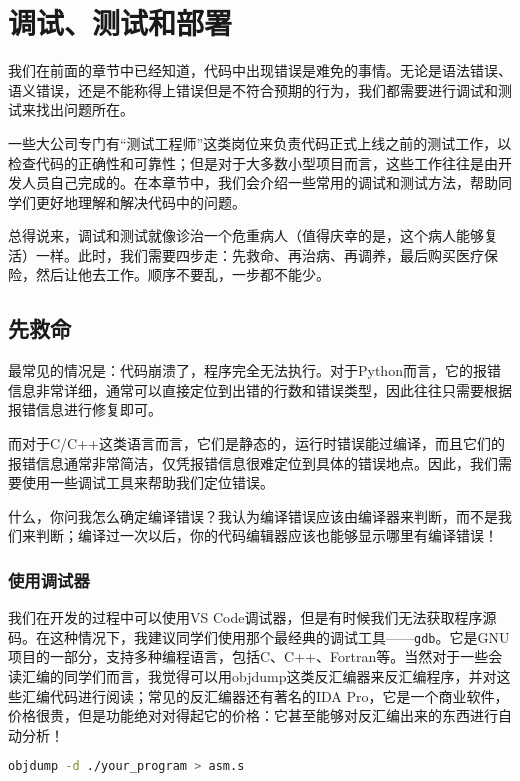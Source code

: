 \chapter{调试、测试和部署}

我们在前面的章节中已经知道，代码中出现错误是难免的事情。无论是语法错误、语义错误，还是不能称得上错误但是不符合预期的行为，我们都需要进行调试和测试来找出问题所在。

一些大公司专门有“测试工程师”这类岗位来负责代码正式上线之前的测试工作，以检查代码的正确性和可靠性；但是对于大多数小型项目而言，这些工作往往是由开发人员自己完成的。在本章节中，我们会介绍一些常用的调试和测试方法，帮助同学们更好地理解和解决代码中的问题。

总得说来，调试和测试就像诊治一个危重病人（值得庆幸的是，这个病人能够复活）一样。此时，我们需要四步走：先救命、再治病、再调养，最后购买医疗保险，然后让他去工作。顺序不要乱，一步都不能少。

\section{先救命}

最常见的情况是：代码崩溃了，程序完全无法执行。对于Python而言，它的报错信息非常详细，通常可以直接定位到出错的行数和错误类型，因此往往只需要根据报错信息进行修复即可。

而对于C/C++这类语言而言，它们是静态的，运行时错误能过编译，而且它们的报错信息通常非常简洁，仅凭报错信息很难定位到具体的错误地点。因此，我们需要使用一些调试工具来帮助我们定位错误。

什么，你问我怎么确定编译错误？我认为编译错误应该由编译器来判断，而不是我们来判断；编译过一次以后，你的代码编辑器应该也能够显示哪里有编译错误！

\subsection{使用调试器}

我们在开发的过程中可以使用VS Code调试器，但是有时候我们无法获取程序源码。在这种情况下，我建议同学们使用那个最经典的调试工具——\texttt{gdb}。它是GNU项目的一部分，支持多种编程语言，包括C、C++、Fortran等。当然对于一些会读汇编的同学们而言，我觉得可以用objdump这类反汇编器来反汇编程序，并对这些汇编代码进行阅读；常见的反汇编器还有著名的IDA Pro，它是一个商业软件，价格很贵，但是功能绝对对得起它的价格：它甚至能够对反汇编出来的东西进行自动分析！
\begin{lstlisting}[language=bash]
    objdump -d ./your_program > asm.s
\end{lstlisting}

